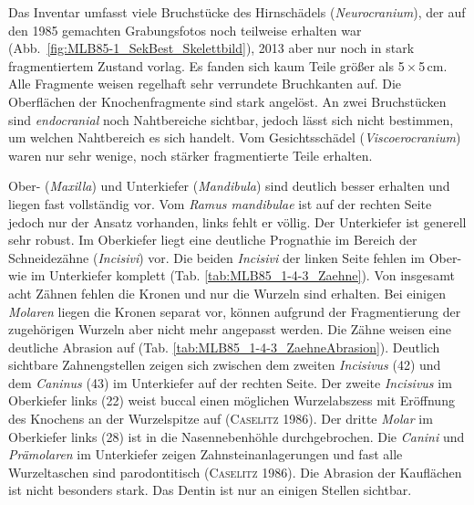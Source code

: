 Das Inventar umfasst viele Bruchstücke des Hirnschädels (\textit{Neurocranium}), der auf den 1985 gemachten Grabungsfotos noch teilweise erhalten war (Abb.~\ref{fig:MLB85-1_SekBest_Skelettbild}), 2013 aber nur noch in stark fragmentiertem Zustand vorlag. Es fanden sich kaum Teile größer als 5\,$\times$\,5\,cm. Alle Fragmente weisen regelhaft sehr verrundete Bruchkanten auf. Die Oberflächen der Knochenfragmente sind stark angelöst. An zwei Bruchstücken sind \textit{endocranial} noch Nahtbereiche sichtbar, jedoch lässt sich nicht bestimmen, um welchen Nahtbereich es sich handelt. Vom Gesichtsschädel (\textit{Viscoerocranium}) waren nur sehr wenige, noch stärker fragmentierte Teile erhalten.

Ober- (\textit{Maxilla}) und Unterkiefer (\textit{Mandibula}) sind deutlich besser erhalten und liegen fast vollständig vor. Vom \textit{Ramus mandibulae} ist auf der rechten Seite jedoch nur der Ansatz vorhanden, links fehlt er völlig. Der Unterkiefer ist generell sehr robust. Im Oberkiefer liegt eine deutliche Prognathie im Bereich der Schneidezähne (\textit{Incisivi}) vor. Die beiden \textit{Incisivi} der linken Seite fehlen im Ober- wie im Unterkiefer komplett (Tab. \ref{tab:MLB85_1-4-3_Zaehne}). Von insgesamt acht Zähnen fehlen die Kronen und nur die Wurzeln sind erhalten. Bei einigen \textit{Molaren} liegen die Kronen separat vor, können aufgrund der Fragmentierung der zugehörigen Wurzeln aber nicht mehr angepasst werden. Die Zähne weisen eine deutliche Abrasion auf (Tab. \ref{tab:MLB85_1-4-3_ZaehneAbrasion}). Deutlich sichtbare Zahnengstellen zeigen sich zwischen dem zweiten \textit{Incisivus} (42) und dem \textit{Caninus} (43) im Unterkiefer auf der rechten Seite. Der zweite \textit{Incisivus} im Oberkiefer links (22) weist buccal einen möglichen Wurzelabszess mit Eröffnung des Knochens an der Wurzelspitze auf (\textsc{Caselitz} 1986). Der dritte \textit{Molar} im Oberkiefer links (28) ist in die Nasennebenhöhle durchgebrochen. Die \textit{Canini} und \textit{Prämolaren} im Unterkiefer zeigen Zahnsteinanlagerungen und fast alle Wurzeltaschen sind parodontitisch (\textsc{Caselitz} 1986). Die Abrasion der Kauflächen ist nicht besonders stark. Das Dentin ist nur an einigen Stellen sichtbar.

